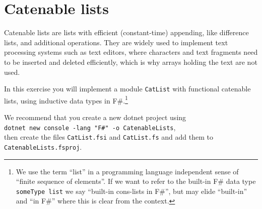\section*{Catenable lists}

Catenable lists are lists with efficient (constant-time) appending, like difference lists, and additional operations.  They are widely used to implement text processing systems such as text editors, where characters and text fragments need to be inserted and deleted efficiently, which is why arrays holding the text are not used.

In this exercise you will implement a module \texttt{CatList} with functional catenable lists, using inductive data types in F\#.\footnote{We use the term ``list'' in a programming language independent sense of ``finite sequence of elements''.  If we want to refer to the built-in F\# data type \texttt{someType list} we say ``built-in cons-lists in F\#'', but may elide ``built-in'' and ``in F\#'' where this is clear from the context.}


We recommend that you create a new dotnet project using \\
\texttt{dotnet new console -lang "F\#" -o CatenableLists}, \\
then create the files \texttt{CatList.fsi} and \texttt{CatList.fs} and add them to \texttt{CatenableLists.fsproj}.

